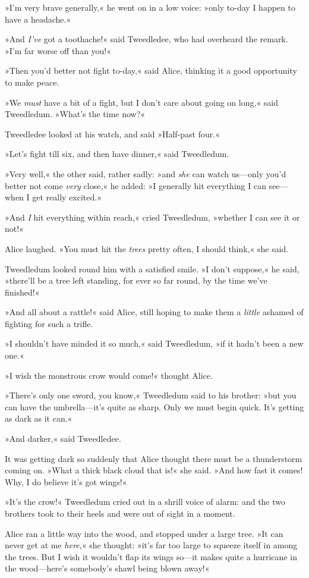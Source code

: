 »I'm very brave generally,« he went on in a low voice: »only to-day I happen to have a headache.«

»And \textit{I've} got a toothache!« said Tweedledee, who had overheard the remark. »I'm far worse off than you!«

»Then you'd better not fight to-day,« said Alice, thinking it a good opportunity to make peace.

»We \textit{must} have a bit of a fight, but I don't care about going on long,« said Tweedledum. »What's the time now?«

Tweedledee looked at his watch, and said »Half-past four.«

»Let's fight till six, and then have dinner,« said Tweedledum.

»Very well,« the other said, rather sadly: »and \textit{she} can watch us—only you'd better not come \textit{very} close,« he added: »I generally hit everything I can see—when I get really excited.«

»And \textit{I} hit everything within reach,« cried Tweedledum, »whether I can see it or not!«

Alice laughed. »You must hit the \textit{trees} pretty often, I should think,« she said.

Tweedledum looked round him with a satisfied smile. »I don't suppose,« he said, »there'll be a tree left standing, for ever so far round, by the time we've finished!«

»And all about a rattle!« said Alice, still hoping to make them a \textit{little} ashamed of fighting for such a trifle.

»I shouldn't have minded it so much,« said Tweedledum, »if it hadn't been a new one.«

»I wish the monstrous crow would come!« thought Alice.

»There's only one sword, you know,« Tweedledum said to his brother: »but you can have the umbrella—it's quite as sharp. Only we must begin quick. It's getting as dark as it can.«

»And darker,« said Tweedledee.

It was getting dark so suddenly that Alice thought there must be a thunderstorm coming on. »What a thick black cloud that is!« she said. »And how fast it comes! Why, I do believe it's got wings!«

»It's the crow!« Tweedledum cried out in a shrill voice of alarm: and the two brothers took to their heels and were out of sight in a moment.

Alice ran a little way into the wood, and stopped under a large tree. »It can never get at me \textit{here,}« she thought: »it's far too large to squeeze itself in among the trees. But I wish it wouldn't flap its wings so—it makes quite a hurricane in the wood—here's somebody's shawl being blown away!«

